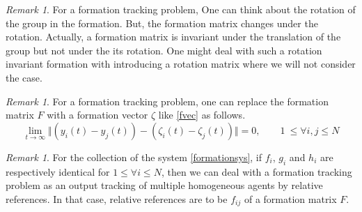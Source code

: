 \documentclass[11pt, a4paper, oneside, openany, reqno]{book}
\theoremstyle{definition}
\theoremstyle{remark}
\newtheorem{remark}[theorem]{Remark}
\numberwithin{equation}{chapter} %
\begin{document}
\begin{remark}
	For a formation tracking problem, 
	One can think about the rotation of the group in the formation.
	But, the formation matrix changes under the rotation.
	Actually, a formation matrix is invariant 
	under the translation of the group but not under the its rotation.
	One might deal with such a rotation invariant formation 
	with introducing a rotation matrix where we will not consider the case.	
\end{remark}

\begin{remark}
	For a formation tracking problem, 
	one can replace the formation matrix $ F $ 
	with a formation vector $ \zeta $ like \eqref{fvec}	as follows.
	\begin{equation}
		\lim_{t \to \infty}\Vert \left(y_i(t) - y_j(t) \right)
		-\left( \zeta_i(t) - \zeta_j(t) \right) \Vert = 0, 
		\qquad 1\ \leq \forall i,j \leq N 	
	\end{equation}	
\end{remark}

\begin{remark}
	For the collection of the system \eqref{formationsys},
	if $ f_i $, $ g_i $ and $ h_i $ are respectively identical for $ 1 \leq \forall i \leq N $, 
	then we can deal with a formation tracking problem as
	an output tracking of multiple homogeneous agents by relative references.
	In that case, relative references are to be $ f_{ij} $ of a formation matrix $ F $.
\end{remark}
\end{document}
